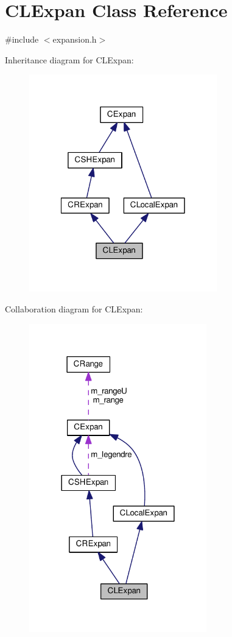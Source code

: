 \hypertarget{classCLExpan}{\section{C\-L\-Expan Class Reference}
\label{classCLExpan}
}


{\ttfamily \#include $<$expansion.\-h$>$}



Inheritance diagram for C\-L\-Expan\-:\nopagebreak
\begin{figure}[H]
\begin{center}
\leavevmode
\includegraphics[width=231pt]{classCLExpan__inherit__graph}
\end{center}
\end{figure}


Collaboration diagram for C\-L\-Expan\-:\nopagebreak
\begin{figure}[H]
\begin{center}
\leavevmode
\includegraphics[width=218pt]{classCLExpan__coll__graph}
\end{center}
\end{figure}
